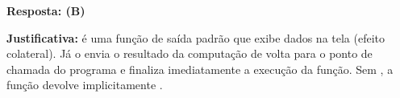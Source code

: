 \ifmostrarGabarito
\textbf{Resposta: (B)}

\textbf{Justificativa:}
 é uma função de saída padrão que exibe dados na tela (efeito colateral). Já o  envia o resultado da computação de volta para o ponto de chamada do programa e finaliza imediatamente a execução da função. Sem , a função devolve implicitamente .

\fi
